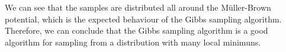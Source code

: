 \documentclass{article}
\begin{document}
We can see that the samples are distributed all around the Müller-Brown potential, which is the expected behaviour of the Gibbs sampling algorithm. Therefore, we can conclude that the Gibbs sampling algorithm is a good algorithm for sampling from a distribution with many local minimuns.



\newpage



\end{document}
